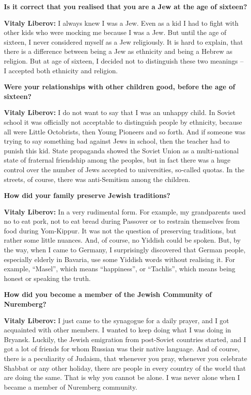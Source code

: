 \textbf{Is it correct that you realised that you are a Jew at the age of sixteen?} 

\textbf{Vitaly Liberov:} I always knew I was a Jew. Even as a kid I had to fight with other kids who were mocking me because I was a Jew. But until the age of sixteen, I never considered myself as a Jew religiously. It is hard to explain, that there is a difference between being a Jew as ethnicity and being a Hebrew as religion. But at age of sixteen, I decided not to distinguish these two meanings – I accepted both ethnicity and religion.  

\textbf{Were your relationships with other children good, before the age of sixteen?} 

\textbf{Vitaly Liberov:} I do not want to say that I was an unhappy child. In Soviet school it was officially not acceptable to distinguish people by ethnicity, because all were Little Octobrists, then Young Pioneers and so forth. And if someone was trying to say something bad against Jews in school, then the teacher had to punish this kid. State propaganda showed the Soviet Union as a multi-national state of fraternal friendship among the peoples, but in fact there was a huge control over the number of Jews accepted to universities, so-called quotas. In the streets, of course, there was anti-Semitism among the children.  

\textbf{How did your family preserve Jewish traditions?} 

\textbf{Vitaly Liberov:} In a very rudimental form. For example, my grandparents used no to eat pork, not to eat bread during Passover or to restrain themselves from food during Yom-Kippur. It was not the question of preserving traditions, but rather some little nuances. And, of course, no Yiddish could be spoken. But, by the way, when I came to Germany, I surprisingly discovered that German people, especially elderly in Bavaria, use some Yiddish words without realising it. For example, ``Masel'', which means ``happiness'', or ``Tachlis'', which means being honest or speaking the truth.  

\textbf{How did you become a member of the Jewish Community of Nuremberg?} 

\textbf{Vitaly Liberov:} I just came to the synagogue for a daily prayer, and I got acquainted with other members. I wanted to keep doing what I was doing in Bryansk. Luckily, the Jewish emigration from post-Soviet countries started, and I got a lot of friends for whom Russian was their native language. And of course, there is a peculiarity of Judaism, that whenever you pray, whenever you celebrate Shabbat or any other holiday, there are people in every country of the world that are doing the same. That is why you cannot be alone. I was never alone when I became a member of Nuremberg community.  

